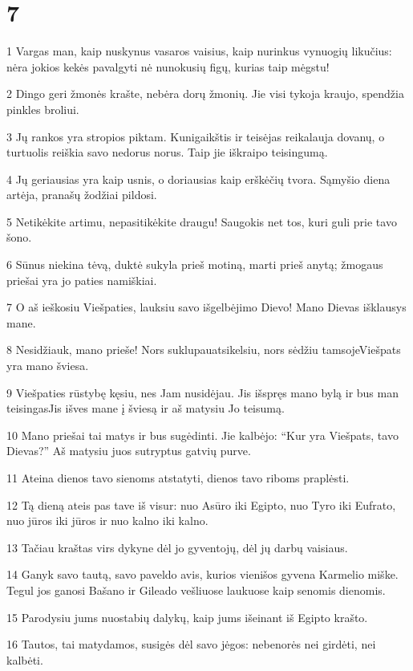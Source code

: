 \chapter{7}


\par 1 Vargas man, kaip nuskynus vasaros vaisius, kaip nurinkus vynuogių likučius: nėra jokios kekės pavalgyti nė nunokusių figų, kurias taip mėgstu! 
\par 2 Dingo geri žmonės krašte, nebėra dorų žmonių. Jie visi tykoja kraujo, spendžia pinkles broliui. 
\par 3 Jų rankos yra stropios piktam. Kunigaikštis ir teisėjas reikalauja dovanų, o turtuolis reiškia savo nedorus norus. Taip jie iškraipo teisingumą. 
\par 4 Jų geriausias yra kaip usnis, o doriausias kaip erškėčių tvora. Sąmyšio diena artėja, pranašų žodžiai pildosi. 
\par 5 Netikėkite artimu, nepasitikėkite draugu! Saugokis net tos, kuri guli prie tavo šono. 
\par 6 Sūnus niekina tėvą, duktė sukyla prieš motiną, marti prieš anytą; žmogaus priešai yra jo paties namiškiai. 
\par 7 O aš ieškosiu Viešpaties, lauksiu savo išgelbėjimo Dievo! Mano Dievas išklausys mane. 
\par 8 Nesidžiauk, mano prieše! Nors suklupau­atsikelsiu, nors sėdžiu tamsoje­Viešpats yra mano šviesa. 
\par 9 Viešpaties rūstybę kęsiu, nes Jam nusidėjau. Jis išspręs mano bylą ir bus man teisingas­Jis išves mane į šviesą ir aš matysiu Jo teisumą. 
\par 10 Mano priešai tai matys ir bus sugėdinti. Jie kalbėjo: “Kur yra Viešpats, tavo Dievas?” Aš matysiu juos sutryptus gatvių purve. 
\par 11 Ateina dienos tavo sienoms atstatyti, dienos tavo riboms praplėsti. 
\par 12 Tą dieną ateis pas tave iš visur: nuo Asūro iki Egipto, nuo Tyro iki Eufrato, nuo jūros iki jūros ir nuo kalno iki kalno. 
\par 13 Tačiau kraštas virs dykyne dėl jo gyventojų, dėl jų darbų vaisiaus. 
\par 14 Ganyk savo tautą, savo paveldo avis, kurios vienišos gyvena Karmelio miške. Tegul jos ganosi Bašano ir Gileado vešliuose laukuose kaip senomis dienomis. 
\par 15 Parodysiu jums nuostabių dalykų, kaip jums išeinant iš Egipto krašto. 
\par 16 Tautos, tai matydamos, susigės dėl savo jėgos: nebenorės nei girdėti, nei kalbėti. 
